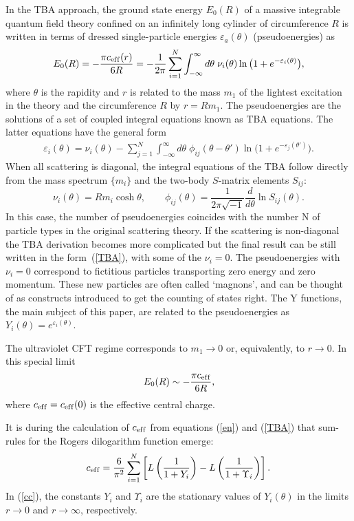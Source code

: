 \documentclass[pdftex]{sigma}
\numberwithin{equation}{section}
\theoremstyle{definition}
\begin{document}
In the TBA  approach, the ground state
energy $E_0(R)$ of a massive  integrable quantum f\/ield theory  conf\/ined
on
an inf\/initely long cylinder of circumference  $R$
is written in terms of dressed single-particle energies $\varepsilon_a(\theta)$ (pseudoenergies)
as
\begin{gather}
E_0(R)=- \frac{\pi c_{\rm ef\/f}(r)}{ 6R} =-\frac{1}{2\pi}\sum_{i=1}^{N}\int_{-\infty}^\infty d\theta\; \nu_i(\theta)
\ln\big(1+e^{-\varepsilon_i(\theta)}\big),
\label{en}
\end{gather}
where $\theta$ is the rapidity and  $r$  is related to the  mass $m_1$
of the lightest excitation in the theory and the circumference  $R$ by  $r=R m_1$.  The pseudoenergies  are
the solutions of a  set
of coupled integral equations known as TBA equations. The latter equations  have the general form
\begin{gather}
\varepsilon_i(\theta) = \nu_i(\theta)  -
\sum_{j=1}^N \int_{-\infty}^{\infty}  d\theta \; \phi_{ij}(\theta-\theta') \ln\big(1+e^{-\varepsilon_j(\theta')}\big).
\label{TBA}
\end{gather}
When all scattering is diagonal, the integral equations of the TBA follow directly from
the mass spectrum $\{ m_i \}$ and the two-body   $S$-matrix elements $S_{ij}$:
\[
 \nu_i(\theta)= R m_i \cosh \theta,\qquad \phi_{ij}(\theta)=  \frac{1}{ 2 \pi
 \sqrt{-1} }\frac{d}{d \theta}\ln S_{ij}(\theta).
\]
In this case, the number of pseudoenergies coincides with the number N of particle types in the
original scattering theory. If the scattering is non-diagonal  the TBA derivation  becomes more complicated but
the f\/inal result  can be  still written  in the form~(\ref{TBA}), with some of the  $\nu_i=0$.
The pseudoenergies with  $\nu_i=0$  correspond to  f\/ictitious particles transporting zero energy and zero momentum.
These new particles are often called `magnons', and can be thought of as constructs introduced
to get the counting of states right. The Y functions, the main subject of this paper,
are related to the pseudoenergies as
$Y_i(\theta)=e^{\varepsilon_i(\theta)}$.


The ultraviolet CFT regime  corresponds to  $m_1 \rightarrow 0$ or, equivalently,
to  $r \rightarrow 0$. In this  special limit
\[
E_0(R) \sim - \frac{\pi c_{\rm ef\/f} }{ 6R},
\]
where $c_{\rm ef\/f}=c_{\rm ef\/f}(0)$ is the  ef\/fective   central  charge.


It is  during the  calculation of $c_{\rm ef\/f}$ from equations  (\ref{en}) and (\ref{TBA}) that  sum-rules for the  Rogers dilogarithm function emerge:
\begin{gather}
c_{\rm ef\/f}= \frac{6}{  \pi^2} \sum_{i=1}^N \left[L\left( \frac{1}{ 1+ Y_i}\right)
- L\left( \frac{1}{ 1+ \Upsilon_i}\right) \right].
\label{cc}
\end{gather}
In (\ref{cc}), the  constants $Y_i$ and $\Upsilon_i$
are the stationary values of  $Y_i(\theta)$ in the limits $r \rightarrow 0$ and
$r \rightarrow \infty$, respectively.
\end{document}
